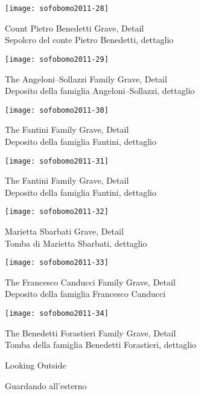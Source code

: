 \begin{center}
\texttt{[image: sofobomo2011-28]}

{Count Pietro Benedetti Grave, Detail}\\
{\footnotesize Sepolcro del conte Pietro Benedetti, dettaglio}
\vspace*{\fill}
\newpage

\texttt{[image: sofobomo2011-29]}

{The Angeloni--Sollazzi Family Grave, Detail}\\
{\footnotesize Deposito della famiglia Angeloni--Sollazzi, dettaglio}
\vspace*{\fill}
\newpage

\texttt{[image: sofobomo2011-30]}

{The Fantini Family Grave, Detail}\\
{\footnotesize Deposito della famiglia Fantini, dettaglio}
\vspace*{\fill}
\newpage

\texttt{[image: sofobomo2011-31]}

{The Fantini Family Grave, Detail}\\
{\footnotesize Deposito della famiglia Fantini, dettaglio}
\vspace*{\fill}
\newpage

\texttt{[image: sofobomo2011-32]}

{Marietta Sbarbati Grave, Detail}\\
{\footnotesize Tomba di Marietta Sbarbati, dettaglio}
\vspace*{\fill}
\newpage

\texttt{[image: sofobomo2011-33]}

{The Francesco Canducci Family Grave, Detail}\\
{\footnotesize Deposito della famiglia Francesco Canducci}
\vspace*{\fill}
\newpage

\texttt{[image: sofobomo2011-34]}

{The Benedetti Forastieri Family Grave, Detail}\\
{\footnotesize Tomba della famiglia Benedetti Forastieri, dettaglio}
\vspace*{\fill}
\newpage

\pagestyle{empty}
\vspace*{2in}

\hfill{\textsf{\Huge Looking Outside}}

\hfill{\textsf{\LARGE Guardando all'esterno}}


\end{center}
